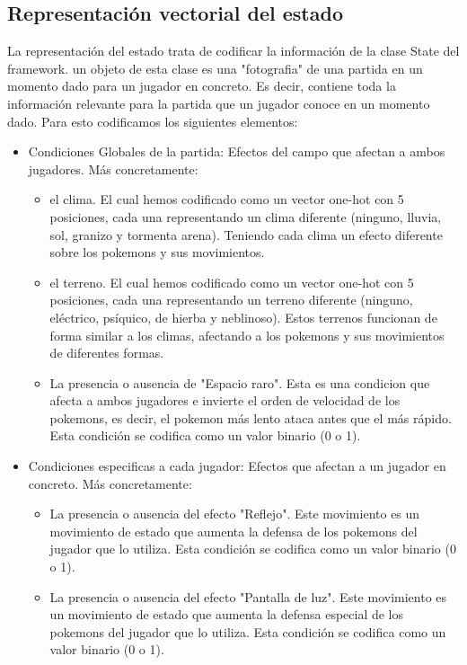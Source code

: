 \subsection{Representación vectorial del estado}
La representación del estado trata de codificar la información de la clase State del framework. un objeto de esta clase es una "fotografia" de una partida en un momento dado para un jugador en concreto. Es decir, contiene toda la información relevante para la partida que un jugador conoce en un momento dado. Para esto codificamos los siguientes elementos:
\begin{itemize}
    \item Condiciones Globales de la partida: Efectos del campo que afectan a ambos jugadores. Más concretamente: 
    \begin{itemize}
        \item el clima. El cual hemos codificado como un vector one-hot con 5 posiciones, cada una representando un clima diferente (ninguno, lluvia, sol, granizo y tormenta arena). Teniendo cada clima un efecto diferente sobre los pokemons y sus movimientos.
        \item el terreno. El cual hemos codificado como un vector one-hot con 5 posiciones, cada una representando un terreno diferente (ninguno, eléctrico, psíquico, de hierba y neblinoso). Estos terrenos funcionan de forma similar a los climas, afectando a los pokemons y sus movimientos de diferentes formas.
        \item La presencia o ausencia de "Espacio raro". Esta es una condicion que afecta a ambos jugadores e invierte el orden de velocidad de los pokemons, es decir, el pokemon más lento ataca antes que el más rápido. Esta condición se codifica como un valor binario (0 o 1).
    \end{itemize}
    \item Condiciones especificas a cada jugador: Efectos que afectan a un jugador en concreto. Más concretamente:
    \begin{itemize}
        \item La presencia o ausencia del efecto "Reflejo". Este movimiento es un movimiento de estado que aumenta la defensa de los pokemons del jugador que lo utiliza. Esta condición se codifica como un valor binario (0 o 1).
        \item La presencia o ausencia del efecto "Pantalla de luz". Este movimiento es un movimiento de estado que aumenta la defensa especial de los pokemons del jugador que lo utiliza. Esta condición se codifica como un valor binario (0 o 1).

\end{itemize}
\end{itemize}

